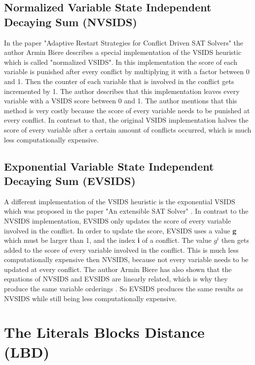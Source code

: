 \subsection{Normalized Variable State Independent Decaying Sum (NVSIDS)}
\label{sec:NVSIDS}

In the paper "Adaptive Restart Strategies for Conflict Driven SAT Solvers" \cite{biere2008adaptive} the author Armin Biere describes a special implementation of the VSIDS heuristic which is called "normalized VSIDS". In this implementation the score of each variable is punished after every conflict by multiplying it with a factor between 0 and 1. Then the counter of each variable that is involved in the conflict gets incremented by 1. The author describes that this implementation leaves every variable with a VSIDS score between 0 and 1. The author mentions that this method is very costly because the score of every variable needs to be punished at every conflict. In contrast to that, the original VSIDS implementation halves the score of every variable after a certain amount of conflicts occurred, which is much less computationally expensive.

\subsection{Exponential Variable State Independent Decaying Sum (EVSIDS)}

A different implementation of the VSIDS heuristic is the exponential VSIDS which was proposed in the paper "An extensible SAT Solver" \cite{een2003extensible}. In contrast to the NVSIDS implementation, EVSIDS only updates the score of every variable involved in the conflict. In order to update the score, EVSIDS uses a value \textbf{g} which must be larger than 1, and the index \textbf{i} of a conflict. The value $g^{i}$ then gets added to the score of every variable involved in the conflict. This is much less computationally expensive then NVSIDS, because not every variable needs to be updated at every conflict. The author Armin Biere has also shown that the equations of NVSIDS and EVSIDS are linearly related, which is why they produce the same variable orderings \cite{biere2008adaptive}. So EVSIDS produces the same results as NVSIDS while still being less computationally expensive.

\section{The Literals Blocks Distance (LBD)}

